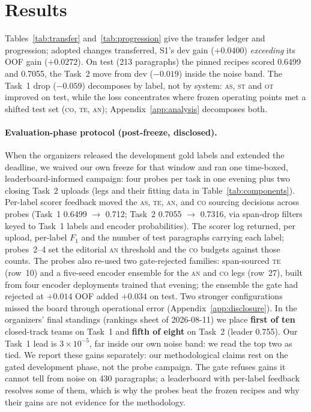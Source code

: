 \documentclass[11pt]{article}
\newcommand{\lab}[1]{\textsc{#1}}
\newcommand{\co}{\lab{co}}
\newcommand{\as}{\lab{as}}
\newcommand{\te}{\lab{te}}
\newcommand{\st}{\lab{st}}
\newcommand{\an}{\lab{an}}
\newcommand{\ot}{\lab{ot}}
\begin{document}
\section{Results}
\label{sec:results}

Tables~\ref{tab:transfer} and~\ref{tab:progression} give the transfer
ledger and progression;
adopted changes transferred, S1's dev gain ($+0.0400$)
\emph{exceeding} its OOF gain ($+0.0272$). On test (213 paragraphs) the
pinned recipes scored 0.6499 and 0.7055, the Task~2 move from dev
($-0.019$) inside the noise band. The Task~1 drop ($-0.059$) decomposes
by label, not by system: \as, \st{} and \ot{} improved on test, while
the loss concentrates where frozen operating points met a shifted test
set (\co, \te, \an); Appendix~\ref{app:analysis} decomposes both.

\paragraph{Evaluation-phase protocol (post-freeze, disclosed).} When the
organizers released the development gold labels and extended the
deadline, we waived our own freeze for that window and ran one
time-boxed, leaderboard-informed campaign: four probes per task in one
evening plus two closing Task~2 uploads (legs and their fitting data
in Table~\ref{tab:components}).
Per-label scorer feedback moved the \as, \te, \an, and \co{} sourcing
decisions across probes (Task~1 0.6499 $\rightarrow$ 0.712; Task~2
0.7055 $\rightarrow$ 0.7316, via span-drop filters keyed to Task~1
labels and encoder probabilities). The scorer log returned, per
upload, per-label $F_1$ and the number of test paragraphs carrying each
label; probes~2--4 set the editorial \an{} threshold and the \co{}
budgets against those counts. The probes also re-used two gate-rejected
families: span-sourced \te{} (row~10) and a five-seed encoder ensemble
for the \an{} and \co{} legs (row~27), built from four encoder
deployments trained that evening; the ensemble the gate had rejected at
$+0.014$ OOF added $+0.034$ on test. Two stronger configurations missed
the board through operational error (Appendix~\ref{app:disclosure}). In
the organizers' final standings (rankings sheet of 2026-08-11) we place
\textbf{first of ten} closed-track teams on Task~1 and \textbf{fifth
of eight} on Task~2 (leader 0.755). Our Task~1 lead is $3{\times}10^{-5}$, far inside our
own noise band: we read the top two as tied. We report these gains
separately: our
methodological claims rest on the gated development phase, not the
probe campaign. The gate refuses gains it cannot tell from noise on 430
paragraphs; a leaderboard with per-label feedback resolves some of
them, which is why the probes beat the frozen recipes and why their
gains are not evidence for the methodology.
\end{document}
